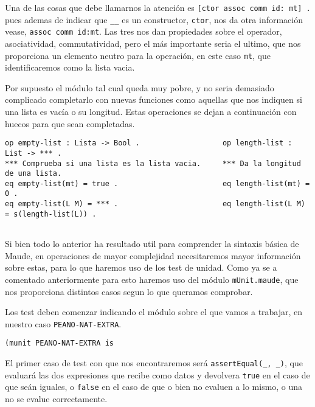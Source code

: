 Una de las cosas que debe llamarnos la atención es \verb"[ctor assoc comm id: mt] ." pues ademas de indicar que \verb"__" es un constructor, \texttt{ctor}, nos da otra información vease, \texttt{assoc comm id:mt}. Las tres nos dan propiedades sobre el operador, asociatividad, commutatividad, pero el más importante seria el ultimo, que nos proporciona un elemento neutro para la operación, en este caso \texttt{mt}, que identificaremos como la lista vacia. \par

Por supuesto el módulo tal cual queda muy pobre, y no seria demasiado complicado completarlo con nuevas funciones como aquellas que nos indiquen si una lista es vacía o su longitud. Estas operaciones se dejan a continuación con huecos para que sean completadas. \par

{\codesize
\begin{verbatim}
op empty-list : Lista -> Bool .                   op length-list : List -> *** .
*** Comprueba si una lista es la lista vacia.     *** Da la longitud de una lista.
eq empty-list(mt) = true .                        eq length-list(mt) = 0 .
eq empty-list(L M) = *** .                        eq length-list(L M) = s(length-list(L)) .
 
\end{verbatim}
}

Si bien todo lo anterior ha resultado util para comprender la sintaxis básica de Maude, en operaciones de mayor complejidad necesitaremos mayor información sobre estas, para lo que haremos uso de los test de unidad. Como ya se a comentado anteriormente para esto haremos uso del módulo \texttt{mUnit.maude}, que nos proporciona distintos casos segun lo que queramos comprobar.\par

Los test deben comenzar indicando el módulo sobre el que vamos a trabajar, en nuestro caso \texttt{PEANO-NAT-EXTRA}. \par

{\codesize
\begin{verbatim}
(munit PEANO-NAT-EXTRA is
\end{verbatim}
}

El primer caso de test con que nos encontraremos será \verb"assertEqual(_, _)", que evaluará las dos expresiones que recibe como datos y devolvera \texttt{true} en el caso de que seán iguales, o \texttt{false} en el caso de que o bien no evaluen a lo mismo, o una no se evalue correctamente. \par

